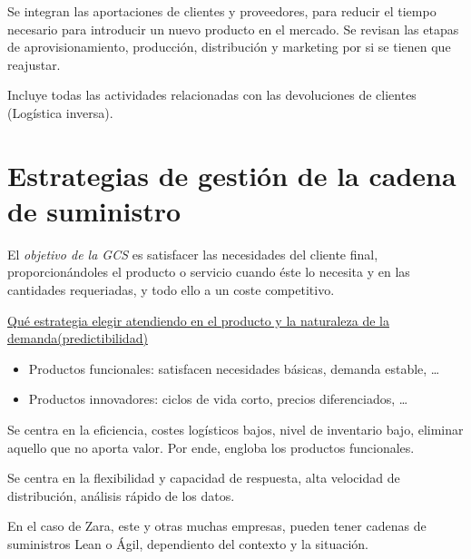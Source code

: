 \documentclass[12pt]{report} %
\providecommand{\tightlist}{%
  \setlength{\itemsep}{0pt}\setlength{\parskip}{0pt}}
\begin{document}
\begin{definicion}
Se integran las aportaciones de clientes y proveedores, para reducir el tiempo necesario para introducir un nuevo producto en el mercado. Se revisan las etapas de aprovisionamiento, producción, distribución y marketing por si se tienen que reajustar.
\end{definicion}

\begin{definicion}[Devoluciones]
Incluye todas las actividades relacionadas con las devoluciones de clientes (Logística inversa).
\end{definicion}

\hypertarget{estrategias-de-gestiuxf3n-de-la-cadena-de-suministro}{%
\section{Estrategias de gestión de la cadena de
suministro}\label{estrategias-de-gestiuxf3n-de-la-cadena-de-suministro}}

El \emph{objetivo de la GCS} es satisfacer las necesidades del cliente
final, proporcionándoles el producto o servicio cuando éste lo necesita
y en las cantidades requeriadas, y todo ello a un coste competitivo.

\underline{Qué estrategia elegir atendiendo en el producto y la naturaleza de la demanda(predictibilidad)}

\begin{itemize}
\tightlist
\item
  Productos funcionales: satisfacen necesidades básicas, demanda
  estable, \ldots{}
\item
  Productos innovadores: ciclos de vida corto, precios diferenciados,
  \ldots{}
\end{itemize}

\begin{definicion}
Se centra en la eficiencia, costes logísticos bajos, nivel de inventario bajo, eliminar aquello que no aporta valor. Por ende, engloba los productos funcionales.
\end{definicion}

\begin{definicion}
Se centra en la flexibilidad y capacidad de respuesta, alta velocidad de distribución, análisis rápido de los datos.
\end{definicion}

En el caso de Zara, este y otras muchas empresas, pueden tener cadenas
de suministros Lean o Ágil, dependiento del contexto y la situación.
\end{document}
